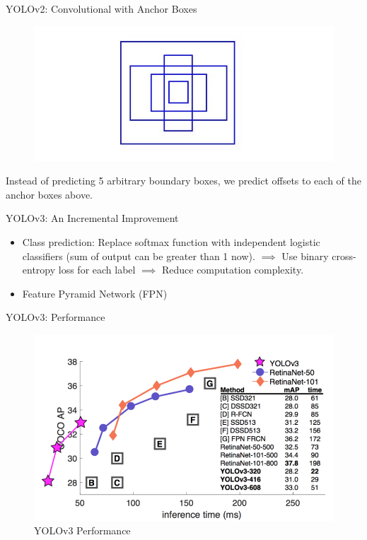 \documentclass[aspectratio=169]{beamer}
\begin{document}
\begin{frame}{YOLOv2: Convolutional with Anchor Boxes}
\begin{figure}
    \centering
    \includegraphics[scale=.3]{demo/figs/yolo4.jpeg}
\end{figure}
Instead of predicting 5 arbitrary boundary boxes, we predict offsets to each of the anchor boxes above.
\end{frame}

\begin{frame}{YOLOv3: An Incremental Improvement}
\begin{itemize}
    \item Class prediction: Replace softmax function with independent logistic classifiers (sum of output can be greater than 1 now). $\implies$ Use binary cross-entropy loss for each label $\implies$ Reduce computation complexity.
    \item Feature Pyramid Network (FPN)
\end{itemize}
\end{frame}

\begin{frame}{YOLOv3: Performance}
\begin{figure}
    \centering
    \includegraphics[scale=.3]{demo/figs/yoloper.png}
    \caption{YOLOv3 Performance}
\end{figure}
\end{frame}
\end{document}
